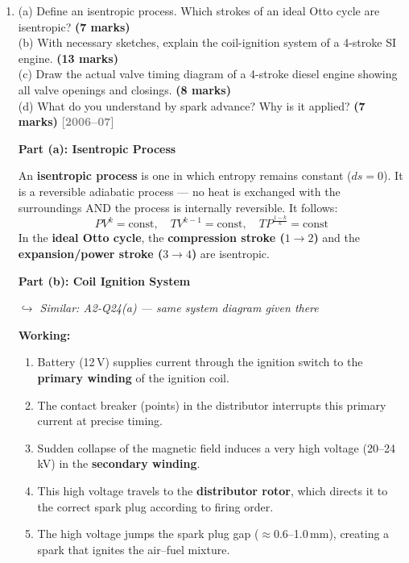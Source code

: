 \documentclass[12pt,a3paper]{article}
\newcommand{\yr}[1]{\hfill\textcolor{gray}{\small\textbf{[#1]}}}
\newcommand{\mk}[1]{\textcolor{orange!70!black}{\small\textbf{(#1 marks)}}}
\newcommand{\variant}[1]{\par\vspace{1pt}\textcolor{blue!50!black}%
  {\footnotesize\textit{$\hookrightarrow$ Similar: #1}}}
\begin{document}
\begin{enumerate}
\item \label{qlabel:A2-Q25}
(a) Define an isentropic process. Which strokes of an ideal Otto cycle are isentropic? \mk{7}\\
(b) With necessary sketches, explain the coil-ignition system of a 4-stroke SI engine. \mk{13}\\
(c) Draw the actual valve timing diagram of a 4-stroke diesel engine showing all valve openings and closings. \mk{8}\\
(d) What do you understand by spark advance? Why is it applied? \mk{7}
\yr{2006--07}

\begin{tcolorbox}[enhanced,breakable,ansbox,colback=cB!4,colframe=cB,
  boxrule=0.8pt,arc=5pt,
  title={\textbf{Answer}},fonttitle=\bfseries\color{white},colbacktitle=cB]

\textbf{Part (a): Isentropic Process}

An \textbf{isentropic process} is one in which entropy remains constant
($ds = 0$). It is a reversible adiabatic process — no heat is exchanged with the
surroundings AND the process is internally reversible. It follows:
\[
  PV^k = \text{const}, \quad TV^{k-1} = \text{const}, \quad
  TP^{\frac{1-k}{k}} = \text{const}
\]
In the \textbf{ideal Otto cycle}, the \textbf{compression stroke ($1\to2$)} and
the \textbf{expansion/power stroke ($3\to4$)} are isentropic.

\hrulefill

\textbf{Part (b): Coil Ignition System}

\variant{A2-Q24(a) — same system diagram given there}

\textbf{Working:}
\begin{enumerate}[leftmargin=1.5em,itemsep=2pt,label=\arabic*.]
  \item Battery (12\,V) supplies current through the ignition switch to the
        \textbf{primary winding} of the ignition coil.
  \item The contact breaker (points) in the distributor interrupts this primary
        current at precise timing.
  \item Sudden collapse of the magnetic field induces a very high voltage
        (20--24\,kV) in the \textbf{secondary winding}.
  \item This high voltage travels to the \textbf{distributor rotor}, which
        directs it to the correct spark plug according to firing order.
  \item The high voltage jumps the spark plug gap ($\approx$0.6--1.0\,mm),
        creating a spark that ignites the air--fuel mixture.
\end{enumerate}


\end{tcolorbox}
\end{enumerate}
\end{document}
